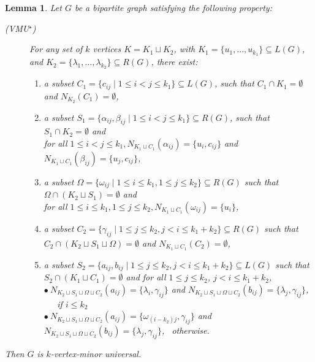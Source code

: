 \documentclass[10pt,a4paper]{article}
\newtheorem{lemma}{Lemma}[section]
\newcommand{\ls}{\leqslant}
\begin{document}
\begin{lemma}\label{lemma:PstarCondition}
    Let $G$ be a bipartite graph satisfying the following property:
    \begin{description}
        \item[{\rm\em (VMU$^\star$)}] For any set of $k$ vertices $K=K_1 \sqcup K_2$, with $K_1 = \{u_1, \ldots , u_{k_1}\} \subseteq L(G)$, and $K_2=\{\lambda_1, \ldots, \lambda_{k_2} \} \subseteq R(G)$, there exist:
    \begin{enumerate}
        \item a subset $C_1 = \{c_{ij} \mid 1 \ls i < j \ls k_1\} \subseteq L(G)$, such that  $C_1 \cap K_1 = \emptyset$ and $N_{K_2}(C_1) = \emptyset$,
        
        \item a subset $S_1 = \{\alpha_{ij}, \beta_{ij} \mid 1 \ls i < j \ls k_1\} \subseteq R(G)$, such that $S_1 \cap K_2 = \emptyset$ and \\ for all $ 1 \ls i < j \ls k_1, N_{K_1 \sqcup C_1}(\alpha_{ij}) = \{u_i, c_{ij}\}$ and $N_{K_1 \sqcup C_1}(\beta_{ij}) = \{u_j, c_{ij}\}$,
        
        \item a subset $\Omega  = \{\omega_{ij} \mid 1 \ls i \ls k_1, 1 \ls j \ls k_2\} \subseteq R(G)$ such that $\Omega \cap(K_2 \sqcup S_1) = \emptyset$ and \\ for all $1 \ls i \ls k_1, 1 \ls j \ls k_2, N_{K_1 \sqcup C_1}(\omega_{ij}) = \{u_i\}$,
        
        \item a subset $C_{2}=\{\gamma_{ij} \mid 1 \ls j \ls k_2, j < i \ls k_1 + k_2 \} \subseteq R(G)$ such that $C_2 \cap (K_2 \sqcup S_1 \sqcup \Omega) = \emptyset$ and $N_{K_1 \sqcup C_1}(C_2)=\emptyset$,
        \item a subset $S_2= \{a_{ij}, b_{ij} \mid 1 \ls j \ls k_2, j < i \ls k_1 + k_2  \} \subseteq L(G)$ such that $S_2 \cap (K_1 \sqcup C_1) = \emptyset$ and for all $1 \ls j \ls k_2$, $j < i \ls k_1 + k_2$, \\
        $\bullet\ N_{K_2 \sqcup S_1 \sqcup \Omega \sqcup C_2}(a_{ij}) = \{\lambda_i, \gamma_{ij}\}$ and $N_{K_2 \sqcup S_1 \sqcup \Omega \sqcup C_2}(b_{ij}) = \{\lambda_j, \gamma_{ij}\}$, \qquad\ \ \ if $i \ls k_2$ \\
        $\bullet\ N_{K_2 \sqcup S_1 \sqcup \Omega \sqcup C_2}(a_{ij}) = \{\omega_{(i-k_2)j}, \gamma_{ij}\}$ and  $N_{K_2 \sqcup S_1 \sqcup \Omega \sqcup C_2}(b_{ij}) = \{\lambda_j, \gamma_{ij}\}$, \ otherwise.
    \end{enumerate}
    \end{description}
    Then $G$ is $k$-vertex-minor universal.
\end{lemma}
\end{document}
